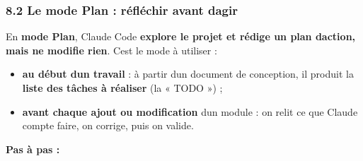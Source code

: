 \documentclass[
  french,
  11pt,
  a4paper,
]{article}
\providecommand{\tightlist}{%
  \setlength{\itemsep}{0pt}\setlength{\parskip}{0pt}}
\begin{document}
\subsubsection{8.2 Le mode Plan : réfléchir avant
d\textquotesingle agir}\label{82-le-mode-plan--ruxe9fluxe9chir-avant-dagir}

En \textbf{mode Plan}, Claude Code \textbf{explore le projet et rédige
un plan d\textquotesingle action, mais ne modifie rien}.
C\textquotesingle est le mode à utiliser :

\begin{itemize}
\tightlist
\item
  \textbf{au début d\textquotesingle un travail} : à partir
  d\textquotesingle un document de conception, il produit la
  \textbf{liste des tâches à réaliser} (la « TODO ») ;
\item
  \textbf{avant chaque ajout ou modification} d\textquotesingle un
  module : on relit ce que Claude compte faire, on corrige, puis on
  valide.
\end{itemize}

\textbf{Pas à pas :}
\end{document}
